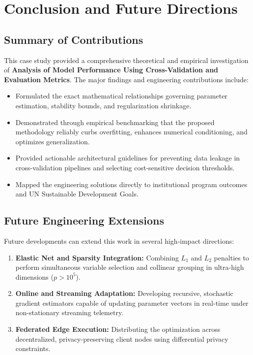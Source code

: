 \section{Conclusion and Future Directions}

\subsection{Summary of Contributions}
This case study provided a comprehensive theoretical and empirical investigation of \textbf{Analysis of Model Performance Using Cross-Validation and Evaluation Metrics}. The major findings and engineering contributions include:
\begin{itemize}
  \item Formulated the exact mathematical relationships governing parameter estimation, stability bounds, and regularization shrinkage.
  \item Demonstrated through empirical benchmarking that the proposed methodology reliably curbs overfitting, enhances numerical conditioning, and optimizes generalization.
  \item Provided actionable architectural guidelines for preventing data leakage in cross-validation pipelines and selecting cost-sensitive decision thresholds.
  \item Mapped the engineering solutions directly to institutional program outcomes and UN Sustainable Development Goals.
\end{itemize}

\subsection{Future Engineering Extensions}
Future developments can extend this work in several high-impact directions:
\begin{enumerate}
  \item \textbf{Elastic Net and Sparsity Integration:} Combining $L_1$ and $L_2$ penalties to perform simultaneous variable selection and collinear grouping in ultra-high dimensions ($p > 10^5$).
  \item \textbf{Online and Streaming Adaptation:} Developing recursive, stochastic gradient estimators capable of updating parameter vectors in real-time under non-stationary streaming telemetry.
  \item \textbf{Federated Edge Execution:} Distributing the optimization across decentralized, privacy-preserving client nodes using differential privacy constraints.
\end{enumerate}
